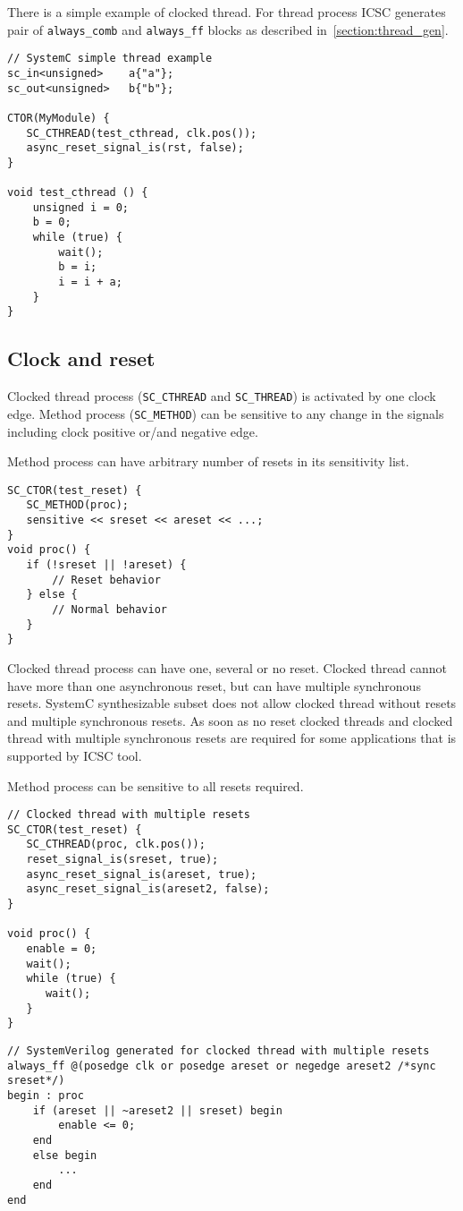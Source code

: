 There is a simple example of clocked thread. For thread process ICSC generates pair of {\tt always\_comb} and {\tt always\_ff} blocks as described in~\ref{section:thread_gen}.

\begin{lstlisting}[style=mycpp]
// SystemC simple thread example
sc_in<unsigned>    a{"a"};
sc_out<unsigned>   b{"b"};
 
CTOR(MyModule) {
   SC_CTHREAD(test_cthread, clk.pos());
   async_reset_signal_is(rst, false);
}
 
void test_cthread () {
    unsigned i = 0;
    b = 0;
    while (true) {
        wait();
        b = i;
        i = i + a;
    }
}
\end{lstlisting}

\subsection{Clock and reset}

Clocked thread process ({\tt SC\_CTHREAD} and {\tt SC\_THREAD}) is activated by one clock edge. Method process ({\tt SC\_METHOD}) can be sensitive to any change in the signals including clock positive or/and negative edge.

Method process can have arbitrary number of resets in its sensitivity list. 
\begin{lstlisting}[style=mycpp]
SC_CTOR(test_reset) {
   SC_METHOD(proc);
   sensitive << sreset << areset << ...;       
}
void proc() {
   if (!sreset || !areset) {
       // Reset behavior
   } else {
       // Normal behavior
   }
}
\end{lstlisting}

Clocked thread process can have one, several or no reset. Clocked thread cannot have more than one asynchronous reset, but can have multiple synchronous resets. SystemC synthesizable subset does not allow clocked thread without resets and multiple synchronous resets. As soon as no reset clocked threads and clocked thread with multiple synchronous resets are required for some applications that is supported by ICSC tool. 

Method process can be sensitive to all resets required.

\begin{lstlisting}[style=mycpp]
// Clocked thread with multiple resets
SC_CTOR(test_reset) {
   SC_CTHREAD(proc, clk.pos());
   reset_signal_is(sreset, true);
   async_reset_signal_is(areset, true);
   async_reset_signal_is(areset2, false);       
}

void proc() {
   enable = 0;
   wait();
   while (true) {
      wait();
   }
}
\end{lstlisting}
%
\begin{lstlisting}[style=mycpp]
// SystemVerilog generated for clocked thread with multiple resets
always_ff @(posedge clk or posedge areset or negedge areset2 /*sync sreset*/) 
begin : proc
    if (areset || ~areset2 || sreset) begin
        enable <= 0;        
    end
    else begin
        ...
    end
end
\end{lstlisting}

